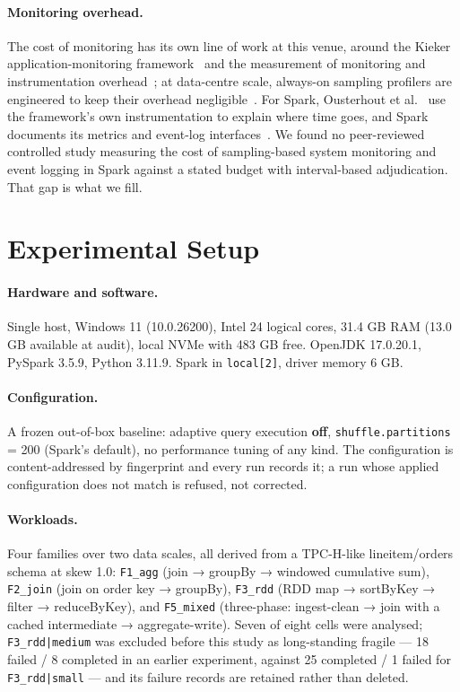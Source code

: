 \documentclass[sigconf,review,anonymous]{acmart}
\newcommand{\cell}[1]{\texttt{#1}}
\begin{document}
\paragraph{Monitoring overhead.} The cost of monitoring has its own line of work at this venue,
around the Kieker application-monitoring framework~\cite{vanhoorn2012kieker} and the measurement of
monitoring and instrumentation overhead~\cite{reichelt2023towards,reichelt2024overhead}; at
data-centre scale, always-on sampling profilers are engineered to keep their overhead
negligible~\cite{ren2010google}. For Spark, Ousterhout et al.~\cite{ousterhout2015making} use the
framework's own instrumentation to explain where time goes, and Spark documents its metrics and
event-log interfaces~\cite{spark2026monitoring}. We found no peer-reviewed controlled study
measuring the cost of sampling-based system monitoring and event logging in Spark against a stated
budget with interval-based adjudication. That gap is what we fill.

\section{Experimental Setup}\label{sec:setup}

\paragraph{Hardware and software.} Single host, Windows 11 (10.0.26200), Intel 24 logical cores,
31.4 GB RAM (13.0 GB available at audit), local NVMe with 483 GB free. OpenJDK 17.0.20.1,
PySpark 3.5.9, Python 3.11.9. Spark in \texttt{local[2]}, driver memory 6 GB.

\paragraph{Configuration.} A frozen out-of-box baseline: adaptive query execution \textbf{off},
\texttt{shuffle.partitions} = 200 (Spark's default), no performance tuning of any kind. The
configuration is content-addressed by fingerprint and every run records it; a run whose applied
configuration does not match is refused, not corrected.

\paragraph{Workloads.} Four families over two data scales, all derived from a TPC-H-like
lineitem/orders schema at skew 1.0: \cell{F1\_agg} (join → groupBy → windowed cumulative sum),
\cell{F2\_join} (join on order key → groupBy), \cell{F3\_rdd} (RDD map → sortByKey → filter → reduceByKey),
and \cell{F5\_mixed} (three-phase: ingest-clean → join with a cached intermediate → aggregate-write).
Seven of eight cells were analysed; \cell{F3\_rdd|medium} was excluded before this study as
long-standing fragile --- 18 failed / 8 completed in an earlier experiment, against 25 completed /
1 failed for \cell{F3\_rdd|small} --- and its failure records are retained rather than deleted.
\end{document}
